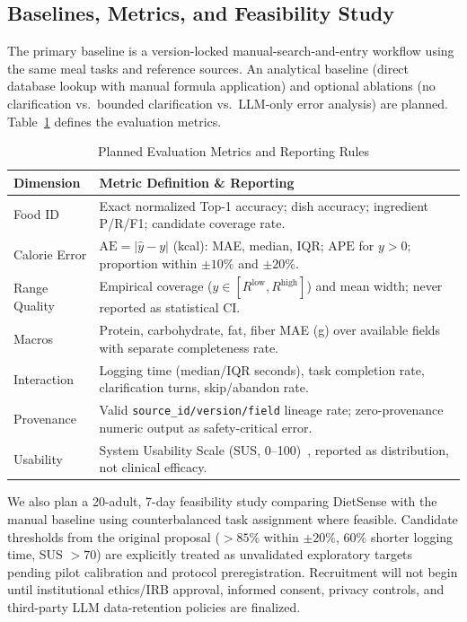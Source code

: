 \documentclass[conference]{IEEEtran}
\begin{document}
\subsection{Baselines, Metrics, and Feasibility Study}
The primary baseline is a version-locked manual-search-and-entry workflow using the same meal tasks and reference sources. An analytical baseline (direct database lookup with manual formula application) and optional ablations (no clarification vs.\ bounded clarification vs.\ LLM-only error analysis) are planned. Table~\ref{tab:metrics} defines the evaluation metrics.

\begin{table}[t]
\centering
\caption{Planned Evaluation Metrics and Reporting Rules}
\label{tab:metrics}
\renewcommand{\arraystretch}{1.12}
\begin{tabularx}{\columnwidth}{@{}l X@{}}
\toprule
\textbf{Dimension} & \textbf{Metric Definition \& Reporting} \\
\midrule
Food ID & Exact normalized Top-1 accuracy; dish accuracy; ingredient P/R/F1; candidate coverage rate. \\
Calorie Error & $\text{AE} = |\hat{y} - y|$ (kcal): MAE, median, IQR; $\text{APE}$ for $y>0$; proportion within $\pm 10\%$ and $\pm 20\%$. \\
Range Quality & Empirical coverage ($y \in [R^{\text{low}}, R^{\text{high}}]$) and mean width; never reported as statistical CI. \\
Macros & Protein, carbohydrate, fat, fiber MAE (g) over available fields with separate completeness rate. \\
Interaction & Logging time (median/IQR seconds), task completion rate, clarification turns, skip/abandon rate. \\
Provenance & Valid \texttt{source\_id/version/field} lineage rate; zero-provenance numeric output as safety-critical error. \\
Usability & System Usability Scale (SUS, 0--100)~\cite{brooke1996sus}, reported as distribution, not clinical efficacy. \\
\bottomrule
\end{tabularx}
\end{table}

We also plan a 20-adult, 7-day feasibility study comparing DietSense with the manual baseline using counterbalanced task assignment where feasible. Candidate thresholds from the original proposal ($>85\%$ within $\pm 20\%$, 60\% shorter logging time, SUS $>70$) are explicitly treated as unvalidated exploratory targets pending pilot calibration and protocol preregistration. Recruitment will not begin until institutional ethics/IRB approval, informed consent, privacy controls, and third-party LLM data-retention policies are finalized.
\end{document}
